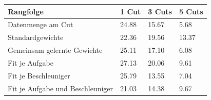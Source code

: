 \begin{tabular}{@{}llll@{}}
\toprule
Rangfolge & 1 Cut & 3 Cuts & 5 Cuts \\
\midrule
Datenmenge am Cut & 24.88 & 15.67 & 5.68 \\
Standardgewichte & 22.36 & 19.56 & 13.37 \\
Gemeinsam gelernte Gewichte & 25.11 & 17.10 & 6.08 \\
Fit je Aufgabe & 27.13 & 20.06 & 9.61 \\
Fit je Beschleuniger & 25.79 & 13.55 & 7.04 \\
Fit je Aufgabe und Beschleuniger & 21.03 & 14.38 & 9.67 \\
\bottomrule
\end{tabular}
